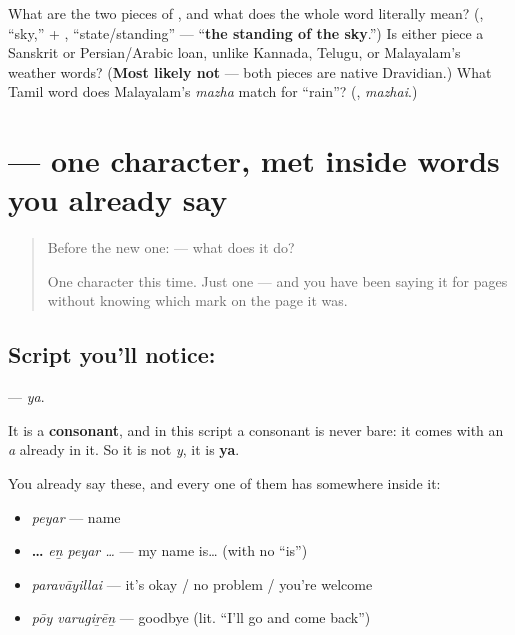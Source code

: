 \begin{tcolorbox}[breakable,colback=teal!4,colframe=teal!35!black,title={Before you move on}]
What are the two pieces of \textbf{}, and what does the whole word literally mean? (\textbf{}, \textquotedblleft{}sky,\textquotedblright{} + \textbf{}, \textquotedblleft{}state/standing\textquotedblright{} — \textquotedblleft{}\textbf{the standing of the sky}.\textquotedblright{}) Is either piece a Sanskrit or Persian/Arabic loan, unlike Kannada, Telugu, or Malayalam's weather words? (\textbf{Most likely not} — both pieces are native Dravidian.) What Tamil word does Malayalam's \emph{mazha} match for \textquotedblleft{}rain\textquotedblright{}? (\textbf{}, \emph{mazhai}.)
\end{tcolorbox}
\section[\texorpdfstring{\ta{ய} (ya)}{ய (ya)}]{ — one character, met inside words you already say}

\label{lesson:TA-S124-letter-ya}



\begin{quote}
Before the new one:  — what does it do?

One character this time. Just one — and you have been saying it for pages without knowing which mark on the page it was.
\end{quote}

\subsection*{Script you'll notice: }
\textbf{} — \emph{ya}.

It is a \textbf{consonant}, and in this script a consonant is never bare: it comes with an \emph{a} already in it. So it is not \emph{y}, it is \textbf{ya}.

You already say these, and every one of them has  somewhere inside it:

\begin{itemize}
\raggedright
  \item \textbf{} \emph{peyar} — name
  \item \textbf{  …} \emph{eṉ peyar …} — my name is… (with no \textquotedblleft{}is\textquotedblright{})
  \item \textbf{} \emph{paravāyillai} — it's okay / no problem / you're welcome
  \item \textbf{ } \emph{pōy varugiṟēṉ} — goodbye (lit. \textquotedblleft{}I'll go and come back\textquotedblright{})
\end{itemize}

